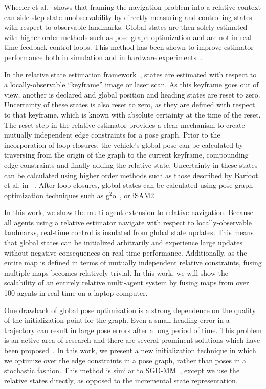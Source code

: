 Wheeler et al.~\cite{Wheeler2017a} shows that framing the navigation problem into a relative context can side-step state unobservability by directly measuring and controlling states with respect to observable landmarks.  Global states are then solely estimated with higher-order methods such as pose-graph optimization and are not in real-time feedback control loops.  This method has been shown to improve estimator performance both in simulation and in hardware experiments~\cite{Wheeler2017a, Wheeler2017b}.

In the relative state estimation framework~\cite{Koch2017}, states are estimated with respect to a locally-observable ``keyframe'' image or laser scan.  As this keyframe goes out of view, another is declared and global position and heading states are reset to zero.  Uncertainty of these states is also reset to zero, as they are defined with respect to that keyframe, which is known with absolute certainty at the time of the reset.  The reset step in the relative estimator provides a clear mechanism to create mutually independent edge constraints for a pose graph.  Prior to the incorporation of loop closures, the vehicle's global pose can be calculated by traversing from the origin of the graph to the current keyframe, compounding edge constraints and finally adding the relative state.  Uncertainty in these states can be calculated using higher order methods such as those described by Barfoot et al. in ~\cite{Barfoot2014}.  After loop closures, global states can be calculated using pose-graph optimization techniques such as g$^2$o~\cite{Kummerle2011}, or iSAM2~\cite{Kaess2012}

In this work, we show the multi-agent extension to relative navigation.  Because all agents using a relative estimator navigate with respect to locally-observable landmarks, real-time control is insulated from global state updates.  This means that global states can be initialized arbitrarily and experience large updates without negative consequences on real-time performance. Additionally, as the entire map is defined in terms of mutually independent relative constraints, fusing multiple maps becomes relatively trivial.  In this work, we will show the scalability of an entirely relative multi-agent system by fusing maps from over 100 agents in real time on a laptop computer.

One drawback of global pose optimization is a strong dependence on the quality of the initialization point for the graph.  Even a small heading error in a trajectory can result in large pose errors after a long period of time.  This problem is an active area of research and there are several prominent solutions which have been proposed~\cite{Carlone2015, Kim2010a, Agarwal2014, Wang2014}.  In this work, we present a new initialization technique in which we optimize over the edge constraints in a pose graph, rather than poses in a stochastic fashion. This method is similar to SGD-MM~\cite{Wang2014}, except we use the relative states directly, as opposed to the incremental state representation.

